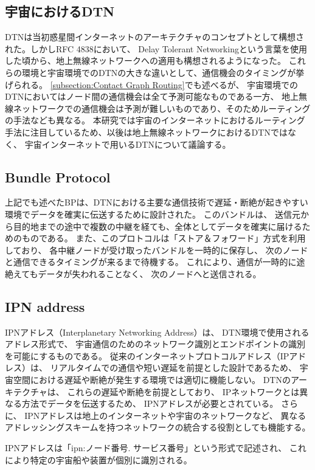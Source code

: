 \subsection{宇宙におけるDTN}
DTNは当初惑星間インターネットのアーキテクチャのコンセプトとして構想された。しかしRFC 4838\cite{rfc4838}において、
Delay Tolerant Networkingという言葉を使用した頃から、地上無線ネットワークへの適用も構想されるようになった。
これらの環境と宇宙環境でのDTNの大きな違いとして、通信機会のタイミングが挙げられる。
\ref{subsection:Contact Graph Routing}でも述べるが、
宇宙環境でのDTNにおいてはノード間の通信機会は全て予測可能なものである一方、
地上無線ネットワークでの通信機会は予測が難しいものであり、そのためルーティングの手法なども異なる。
本研究では宇宙のインターネットにおけるルーティング手法に注目しているため、以後は地上無線ネットワークにおけるDTNではなく、
宇宙インターネットで用いるDTNについて議論する。

\subsection{Bundle Protocol}
\label{subsection:Bundle Protocol}
上記でも述べたBPは、DTNにおける主要な通信技術で遅延・断絶が起きやすい環境でデータを確実に伝送するために設計された。
このバンドルは、 送信元から目的地までの途中で複数の中継を経ても、全体としてデータを確実に届けるためのものである。 
また、このプロトコルは「ストア＆フォワード」方式を利用しており、 各中継ノードが受け取ったバンドルを一時的に保存し、 
次のノードと通信できるタイミングが来るまで待機する。 これにより、通信が一時的に途絶えてもデータが失われることなく、 次のノードへと送信される。

\subsection{IPN address}
\label{subsection:IPN address}
IPNアドレス（Interplanetary Networking Address）は、 DTN環境で使用されるアドレス形式で、
宇宙通信のためのネットワーク識別とエンドポイントの識別を可能にするものである。 従来のインターネットプロトコルアドレス（IPアドレス）は、
リアルタイムでの通信や短い遅延を前提とした設計であるため、 宇宙空間における遅延や断絶が発生する環境では適切に機能しない。
DTNのアーキテクチャは、 これらの遅延や断絶を前提としており、 IPネットワークとは異なる方法でデータを伝送するため、
IPNアドレスが必要とされている。 さらに、 IPNアドレスは地上のインターネットや宇宙のネットワークなど、
異なるアドレッシングスキームを持つネットワークの統合する役割としても機能する。

IPNアドレスは「ipn:ノード番号. サービス番号」という形式で記述され、 これにより特定の宇宙船や装置が個別に識別される。 

